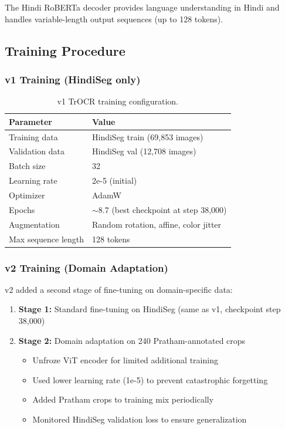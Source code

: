\documentclass[14pt,a4paper]{article}
\begin{document}
The Hindi RoBERTa decoder provides language understanding in Hindi and handles variable-length output sequences (up to 128 tokens).

\subsection{Training Procedure}

\subsubsection{v1 Training (HindiSeg only)}

\begin{table}[h]
    \centering
    \begin{tabular}{ll}
        \toprule
        \textbf{Parameter} & \textbf{Value} \\
        \midrule
        Training data & HindiSeg train (69,853 images) \\
        Validation data & HindiSeg val (12,708 images) \\
        Batch size & 32 \\
        Learning rate & 2e-5 (initial) \\
        Optimizer & AdamW \\
        Epochs & $\sim$8.7 (best checkpoint at step 38,000) \\
        Augmentation & Random rotation, affine, color jitter \\
        Max sequence length & 128 tokens \\
        \bottomrule
    \end{tabular}
    \caption{v1 TrOCR training configuration.}
\end{table}

\subsubsection{v2 Training (Domain Adaptation)}

v2 added a second stage of fine-tuning on domain-specific data:

\begin{enumerate}
    \item \textbf{Stage 1:} Standard fine-tuning on HindiSeg (same as v1, checkpoint step 38,000)
    \item \textbf{Stage 2:} Domain adaptation on 240 Pratham-annotated crops
    \begin{itemize}
        \item Unfroze ViT encoder for limited additional training
        \item Used lower learning rate (1e-5) to prevent catastrophic forgetting
        \item Added Pratham crops to training mix periodically
        \item Monitored HindiSeg validation loss to ensure generalization
    \end{itemize}
\end{enumerate}
\end{document}
